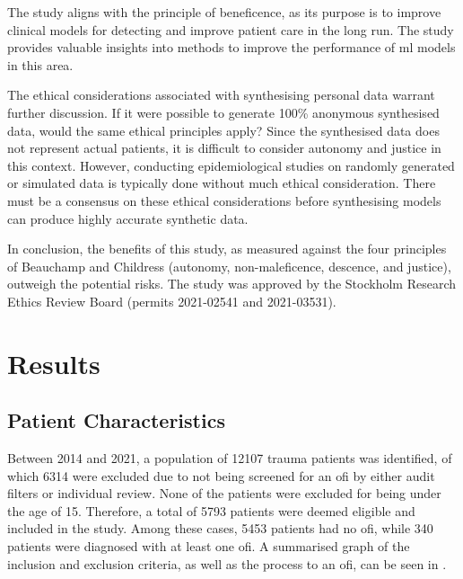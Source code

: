 \documentclass[12pt, a4paper]{article}
\begin{document}
The study aligns with the principle of beneficence, as its purpose is to improve clinical models for detecting
 and improve patient care in the long run. The study provides valuable insights into methods to improve
the performance of \acrshort{ml} models in this area.

The ethical considerations associated with synthesising personal data warrant further discussion. If it were possible
to generate 100\% anonymous synthesised data, would the same ethical principles apply? Since the synthesised data does
not represent actual patients, it is difficult to consider autonomy and justice in this context. However, conducting
epidemiological studies on randomly generated or simulated data is typically done without much ethical consideration.
There must be a consensus on these ethical considerations before synthesising models can produce highly accurate
synthetic data.

In conclusion, the benefits of this study, as measured against the four principles of Beauchamp and Childress
(autonomy, non-maleficence, descence, and justice), outweigh the potential risks. The study was approved by the
Stockholm Research Ethics Review Board (permits 2021-02541 and 2021-03531).

\section{Results}
\subsection{Patient Characteristics}

Between 2014 and 2021, a population of \num{12107} trauma patients was identified, of which \num{6314} were excluded
due to not being screened for an \acrshort{ofi} by either audit filters or individual review. None of the patients were
excluded for being under the age of 15. Therefore, a total of \num{5793} patients were deemed eligible and included in
the study. Among these cases, \num{5453} patients had no \acrshort{ofi}, while \num{340} patients were diagnosed with
at least one \acrshort{ofi}. A summarised graph of the inclusion and exclusion criteria, as well as the process to an
\acrshort{ofi}, can be seen in .
\end{document}
